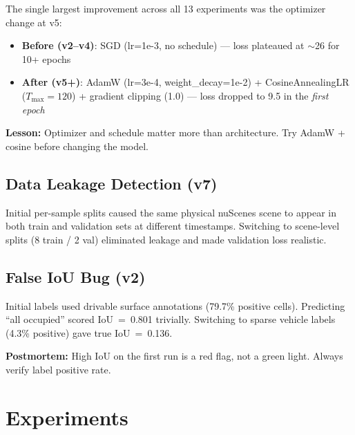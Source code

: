 \documentclass[10pt,twocolumn]{article}
\begin{document}
The single largest improvement across all 13 experiments was the
optimizer change at v5:
\begin{itemize}[leftmargin=*,topsep=2pt,itemsep=1pt]
  \item \textbf{Before (v2--v4)}: SGD (lr=1e-3, no schedule) ---
        loss plateaued at $\sim$26 for 10+ epochs
  \item \textbf{After (v5+)}: AdamW (lr=3e-4, weight\_decay=1e-2) +
        CosineAnnealingLR ($T_{\max}=120$) + gradient clipping (1.0)
        --- loss dropped to 9.5 in the \textit{first epoch}
\end{itemize}

\begin{mdframed}[backgroundcolor=mygray!50,linecolor=myorange,linewidth=1pt]
\textbf{Lesson:} Optimizer and schedule matter more than architecture.
Try AdamW + cosine before changing the model.
\end{mdframed}

\subsection{Data Leakage Detection (v7)}

Initial per-sample splits caused the same physical nuScenes scene to
appear in both train and validation sets at different timestamps.
Switching to scene-level splits (8 train / 2 val) eliminated leakage
and made validation loss realistic.

\subsection{False IoU Bug (v2)}

Initial labels used drivable surface annotations (79.7\% positive
cells). Predicting ``all occupied'' scored IoU~=~0.801 trivially.
Switching to sparse vehicle labels (4.3\% positive) gave true
IoU~=~0.136.

\begin{mdframed}[backgroundcolor=red!5,linecolor=myred,linewidth=1pt]
\textbf{Postmortem:} High IoU on the first run is a red flag, not a
green light. Always verify label positive rate.
\end{mdframed}

\section{Experiments}
\label{sec:experiments}
\end{document}

